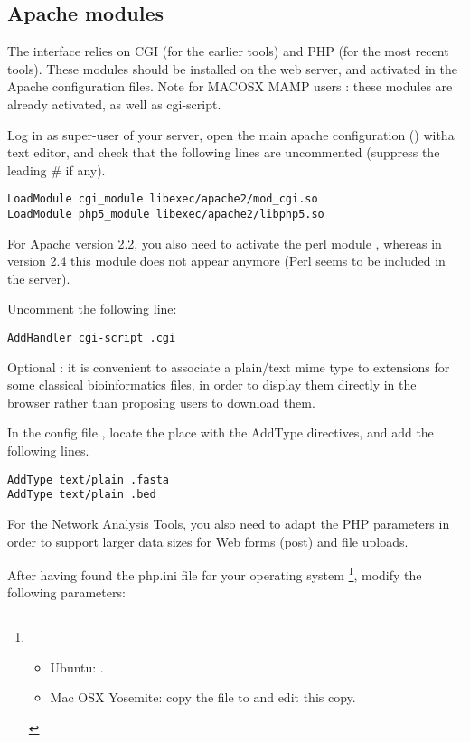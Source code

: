 \documentclass[12pt,a4paper, twoside]{scrreprt} %
\begin{document}
\subsection{Apache modules}

The \RSAT interface relies on CGI (for the earlier tools) and PHP (for
the most recent tools). These modules should be installed on the web
server, and activated in the Apache configuration files. Note for MACOSX MAMP users : these modules are already activated, as well as cgi-script.

Log in as super-user of your server, open the main apache
configuration () witha text editor, and
check that the following lines are uncommented (suppress the leading
\# if any).

\begin{lstlisting}
LoadModule cgi_module libexec/apache2/mod_cgi.so
LoadModule php5_module libexec/apache2/libphp5.so
\end{lstlisting}
                                                        
For Apache version 2.2, you also need to activate the perl module
, whereas in version 2.4 this module does not
appear anymore (Perl seems to be included in the server).

Uncomment the following line:

\begin{lstlisting}
AddHandler cgi-script .cgi
\end{lstlisting}

Optional : it is convenient to associate a plain/text mime type to
extensions for some classical bioinformatics files, in order to
display them directly in the browser rather than proposing users to
download them.

In the config file , locate the place with the AddType
directives, and add the following lines.

\begin{lstlisting}
AddType text/plain .fasta
AddType text/plain .bed
\end{lstlisting}

For the Network Analysis Tools, you also need to adapt the PHP
parameters in order to support larger data sizes for Web forms (post)
and file uploads.


After having found the php.ini file for your operating
system \footnote{
  \begin{itemize}
  \item Ubuntu:  .
  \item Mac OSX Yosemite: copy the file  to
     and edit this copy.
  \end{itemize}
}, modify the following parameters:
\end{document}
